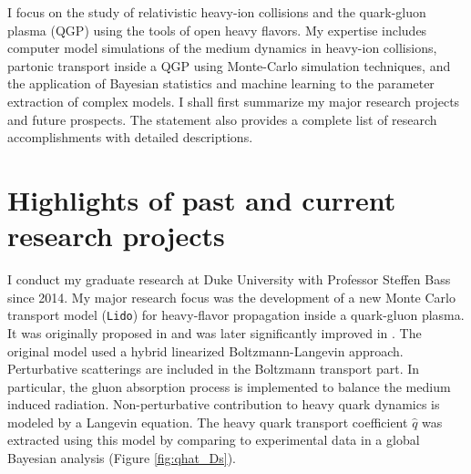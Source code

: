 \documentclass[12pt,a4paper]{revtex4-1}
\begin{document}
I focus on the study of relativistic heavy-ion collisions and the quark-gluon plasma (QGP) using the tools of open heavy flavors.
My expertise includes computer model simulations of the medium dynamics in heavy-ion collisions, partonic transport inside a QGP using Monte-Carlo simulation techniques, and the application of Bayesian statistics and machine learning to the parameter extraction of complex models.
I shall first summarize my major research projects and future prospects. The statement also provides a complete list of research accomplishments with detailed descriptions.


\section*{Highlights of past and current research projects}
I conduct my graduate research at Duke University with Professor Steffen Bass since 2014.
My major research focus was the development of a new Monte Carlo transport model ({\tt Lido}) for heavy-flavor propagation inside a quark-gluon plasma. It was originally proposed in \cite{Ke:2018tsh} and was later significantly improved in \cite{Ke:2018jem}.
The original model used a hybrid linearized Boltzmann-Langevin approach. Perturbative scatterings are included in the Boltzmann transport part. 
In particular, the gluon absorption process is implemented to balance the medium induced radiation. 
Non-perturbative contribution to heavy quark dynamics is modeled by a Langevin equation.
The heavy quark transport coefficient $\hat{q}$ was extracted using this model by comparing to experimental data in a global Bayesian analysis (Figure \ref{fig:qhat_Ds}).
\end{document}

